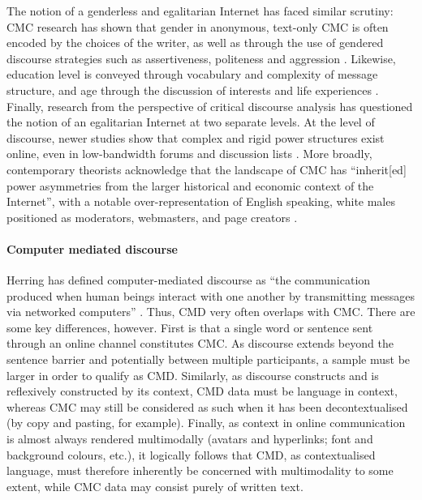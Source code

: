 				The notion of a genderless and egalitarian Internet has faced similar scrutiny: CMC research has shown that gender in anonymous, text-only CMC is often encoded by the  choices of the writer, as well as through the use of gendered discourse strategies such as assertiveness, politeness and aggression \cite{herring_gender_2000}. Likewise, education level is conveyed through vocabulary and complexity of message structure, and age through the discussion of interests and life experiences \cite{herring_computer-mediated_2001}. Finally, research from the perspective of critical discourse analysis has questioned the notion of an egalitarian Internet at two separate levels. At the level of discourse, newer studies show that complex and rigid power structures exist online, even in low-bandwidth forums and discussion lists \cite[e.g.][]{stommel_online_2010}. More broadly, contemporary theorists acknowledge that the landscape of CMC has ``inherit[ed] power asymmetries from the larger historical and economic context of the Internet'', with a notable over-representation of English speaking, white males positioned as moderators, webmasters, and page creators \cite[p.~12]{herring_computer-mediated_2001}.

			\paragraph{Computer mediated discourse}

				Herring has defined computer-mediated discourse as ``the communication produced when human beings interact with one another by transmitting messages via networked computers'' \cite[n.p]{herring_computer-mediated_2001}. Thus, CMD very often overlaps with CMC. There are some key differences, however. First is that a single word or sentence sent through an online channel constitutes CMC. As discourse extends beyond the sentence barrier and potentially between multiple participants, a sample must be larger in order to qualify as CMD. Similarly, as discourse constructs and is reflexively constructed by its context, CMD data must be language in context, whereas CMC may still be considered as such when it has been decontextualised (by copy and pasting, for example). Finally, as context in online communication is almost always rendered multimodally (avatars and hyperlinks; font and background colours, etc.), it logically follows that CMD, as contextualised language, must therefore inherently be concerned with multimodality to some extent, while CMC data may consist purely of written text.

